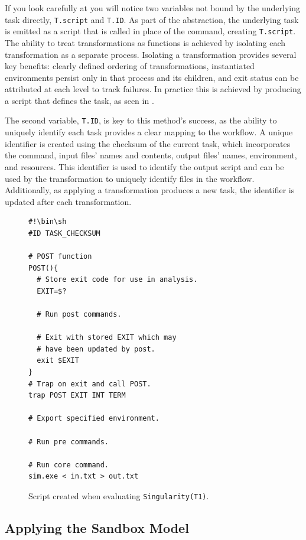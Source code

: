 \documentclass[conference]{IEEEtran}
\begin{document}
If you look carefully at 
you will notice two variables not
bound by the underlying task
directly, {\tt T.script} and {\tt T.ID}.
As part of the abstraction, the 
underlying task is emitted as a script
that is called in place of the command,
creating {\tt T.script}.
The ability to treat transformations as functions 
is achieved by isolating 
each transformation as a separate process.
Isolating a transformation provides 
several key benefits:
clearly defined ordering of transformations,
instantiated environments persist only 
in that process and its children,
and exit status can be attributed 
at each level to track failures.
In practice this is achieved by 
producing a script that
defines the task, as seen in .

The second variable, {\tt T.ID},
is key to this method's success, as 
the ability to uniquely identify
each task provides a clear
mapping to the workflow.
A unique identifier is created
using the checksum of the
current task, which incorporates the
command, input files' names and contents,
output files' names, environment, and
resources. 
This identifier is used to identify the output
script and can be used by the
transformation to uniquely identify 
files in the workflow.
Additionally, as applying a transformation
produces a new task, the identifier 
is updated after each transformation.

\begin{figure}[h]
\begin{framed}
\small
\begin{verbatim}
#!\bin\sh
#ID TASK_CHECKSUM

# POST function
POST(){
  # Store exit code for use in analysis.
  EXIT=$?
  
  # Run post commands.
  
  # Exit with stored EXIT which may
  # have been updated by post.
  exit $EXIT
}
# Trap on exit and call POST.
trap POST EXIT INT TERM

# Export specified environment.

# Run pre commands.

# Run core command.
sim.exe < in.txt > out.txt
\end{verbatim}
\end{framed}
\caption{Script created when evaluating {\tt Singularity(T1)}.}
\label{task-script}
\end{figure}


\subsection{Applying the Sandbox Model}
\end{document}
